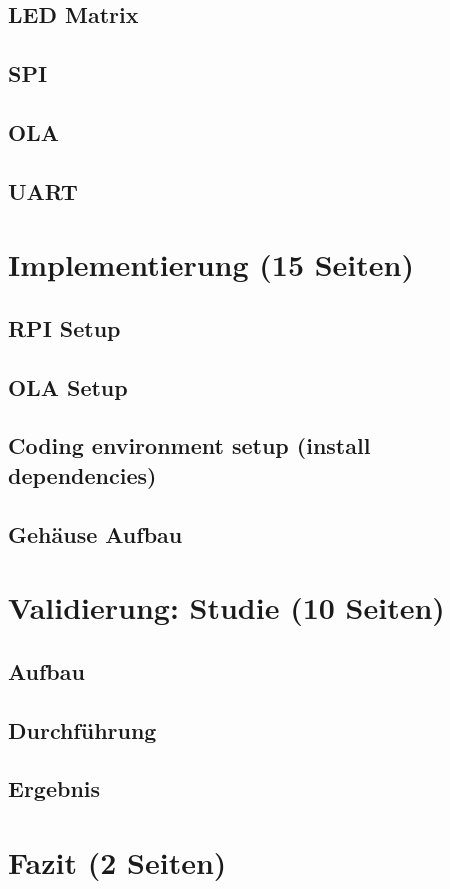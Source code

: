 \section{LED Matrix}
\section{SPI}
\section{OLA}
\section{UART}

\chapter{Implementierung (15 Seiten)}
\section{RPI Setup}
\section{OLA Setup}
\section{Coding environment setup (install dependencies)}
\section{Gehäuse Aufbau}

\chapter{Validierung: Studie (10 Seiten)}
\section{Aufbau}
\section{Durchführung}
\section{Ergebnis}

\chapter{Fazit (2 Seiten)}
